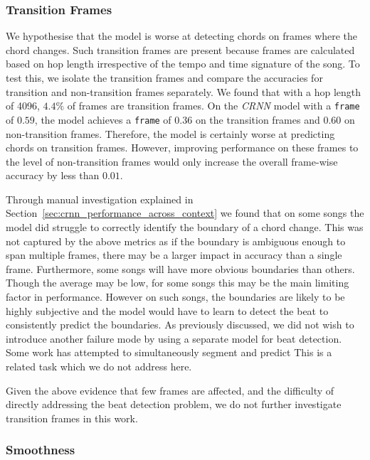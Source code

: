 \subsubsection{Transition Frames}

We hypothesise that the model is worse at detecting chords on frames where the chord changes. Such transition frames are present because frames are calculated based on hop length irrespective of the tempo and time signature of the song. To test this, we isolate the transition frames and compare the accuracies for transition and non-transition frames separately. We found that with a hop length of 4096, $4.4\%$ of frames are transition frames. On the \emph{CRNN} model with a \texttt{frame} of $0.59$, the model achieves a \texttt{frame} of $0.36$ on the transition frames and $0.60$ on non-transition frames. Therefore, the model is certainly worse at predicting chords on transition frames. However, improving performance on these frames to the level of non-transition frames would only increase the overall frame-wise accuracy by less than $0.01$. 

Through manual investigation explained in Section~\ref{sec:crnn_performance_across_context} we found that on some songs the model did struggle to correctly identify the boundary of a chord change. This was not captured by the above metrics as if the boundary is ambiguous enough to span multiple frames, there may be a larger impact in accuracy than a single frame. Furthermore, some songs will have more obvious boundaries than others. Though the average may be low, for some songs this may be the main limiting factor in performance. However on such songs, the boundaries are likely to be highly subjective and the model would have to learn to detect the beat to consistently predict the boundaries. As previously discussed, we did not wish to introduce another failure mode by using a separate model for beat detection. Some work has attempted to simultaneously segment and predict This is a related task which we do not address here.

Given the above evidence that few frames are affected, and the difficulty of directly addressing the beat detection problem, we do not further investigate transition frames in this work.

\subsubsection{Smoothness}

